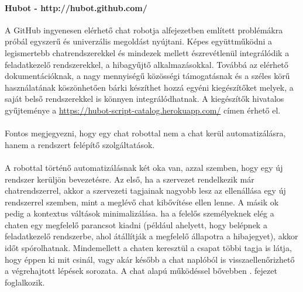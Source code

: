 \paragraph{Hubot - http://hubot.github.com/} A GitHub ingyenesen elérhető chat robotja  alfejezetben említett problémákra próbál egyszerű és univerzális megoldást nyújtani. Képes együttműködni a legismertebb chatrendszerekkel és mindezek mellett észrevétlenül integrálódik a feladatkezelő rendszerekkel, a hibagyűjtő alkalmazásokkal. Továbbá az elérhető dokumentációknak, a nagy mennyiségű közösségi támogatásnak és a széles körű használatának köszönhetően bárki készíthet hozzá egyéni kiegészítőket melyek, a saját belső rendszerekkel is könnyen integrálódhatnak. A kiegészítők hivatalos gyűjteménye a \url{https://hubot-script-catalog.herokuapp.com/} címen érhető el.\\
\hfill\\
Fontos megjegyezni, hogy egy chat robottal nem a chat kerül automatizálásra, hanem a rendszert felépítő szolgáltatások.\\
\hfill\\
A robottal történő automatizálásnak két oka van, azzal szemben, hogy egy új rendszer kerüljön bevezetésre.
Az első, ha a szervezet rendelkezik már chatrendszerrel, akkor a szervezeti tagjainak nagyobb lesz az ellenállása egy új rendszerrel szemben, mint a meglévő chat kibővítése ellen lenne.
A másik ok pedig a kontextus váltások minimalizálása. ha a felelős személyeknek elég a chaten egy megfelelő parancsot kiadni (például ahelyett, hogy belépnek a feladatkezelő rendszerbe, ahol átállítják a megfelelő állapotra a hibajegyet), akkor időt spórolhatnak. Mindemellett a chaten keresztül a csapat többi tagja is látja, hogy éppen ki mit csinál, vagy akár később a chat naplóból is visszaellenőrizhető a végrehajtott lépések sorozata. A chat alapú működéssel bővebben . fejezet foglalkozik.
